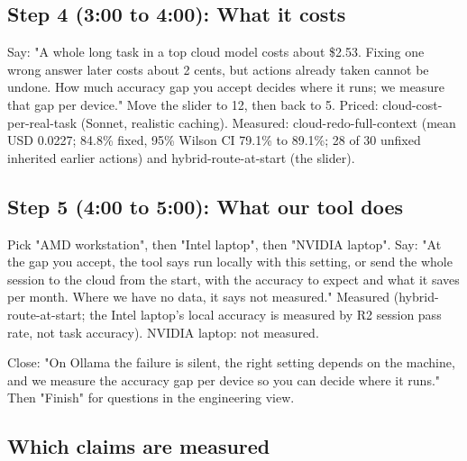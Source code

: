 \subsection*{Step 4 (3:00 to 4:00): What it costs}

Say: "A whole long task in a top cloud model costs about \$2.53. Fixing one wrong answer later costs about 2 cents, but
actions already taken cannot be undone. How much accuracy gap you accept decides where it runs; we measure that gap
per device." Move the slider to 12, then back to 5. Priced: cloud-cost-per-real-task (Sonnet, realistic caching).
Measured: cloud-redo-full-context (mean USD 0.0227; 84.8\% fixed, 95\% Wilson CI 79.1\% to 89.1\%; 28 of 30 unfixed
inherited earlier actions) and hybrid-route-at-start (the slider).

\subsection*{Step 5 (4:00 to 5:00): What our tool does}

Pick "AMD workstation", then "Intel laptop", then "NVIDIA laptop". Say: "At the gap you accept, the tool says run
locally with this setting, or send the whole session to the cloud from the start, with the accuracy to expect and what
it saves per month. Where we have no data, it says not measured." Measured (hybrid-route-at-start; the Intel laptop's
local accuracy is measured by R2 session pass rate, not task accuracy). NVIDIA laptop: not measured.

Close: "On Ollama the failure is silent, the right setting depends on the machine, and we measure the accuracy gap per device so
you can decide where it runs." Then "Finish" for questions in the engineering view.

\subsection*{Which claims are measured}

